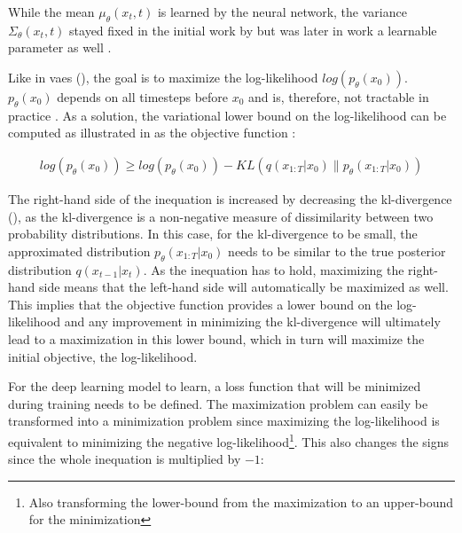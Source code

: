 While the mean $\mu_{\theta}(x_t, t)$ is learned by the neural network, the variance $\Sigma_{\theta}(x_t, t)$ stayed fixed in the initial work by \cite{ho2020DenoisingDiffusionProbabilistic} 
but was later in \textcite{nichol2021ImprovedDenoisingDiffusion} work a learnable parameter as well \cite{zbinden2022ImplementingExperimentingDiffusion}.

Like in \glspl{vae} (), the goal is to maximize the log-likelihood $log(p_\theta(x_0))$.
$p_\theta(x_0)$ depends on all timesteps before $x_0$ and is, therefore, not tractable in practice \cite{zbinden2022ImplementingExperimentingDiffusion}.
As a solution, the variational lower bound on the log-likelihood can be computed as illustrated in as the objective function : %

\begin{equation}
  \label{eqn:vlb}
  \begin{align*}
    log(p_\theta(x_0)) \geq log(p_\theta(x_0)) - KL(q(x_{1:T}|x_0) \parallel p_\theta(x_{1:T}|x_0))
  \end{align*}
\end{equation}

The right-hand side of the inequation is increased by decreasing the \gls{kl}-divergence (), as the \gls{kl}-divergence is a non-negative measure of dissimilarity between two probability distributions. 
In this case, for the \gls{kl}-divergence to be small, the approximated distribution $p_\theta(x_{1:T}|x_0)$ needs to be similar to the true posterior distribution $q(x_{t-1}|x_t)$.
As the inequation has to hold, maximizing the right-hand side means that the left-hand side will automatically be maximized as well.
This implies that the objective function provides a lower bound on the log-likelihood and any improvement in minimizing the \gls{kl}-divergence will ultimately lead to a maximization in this lower bound, which in turn will maximize the initial objective, the log-likelihood.

For the deep learning model to learn, a loss function that will be minimized during training needs to be defined.
The maximization problem can easily be transformed into a minimization problem since maximizing the log-likelihood is equivalent to minimizing the negative log-likelihood\footnote{Also transforming the lower-bound from the maximization to an upper-bound for the minimization}.
This also changes the signs since the whole inequation is multiplied by $-1$:

